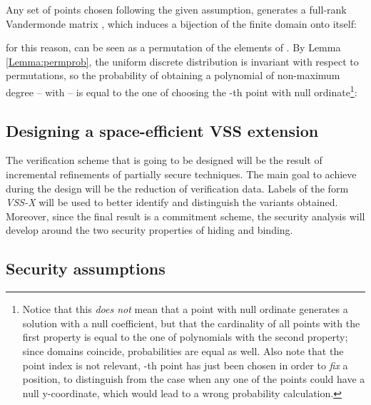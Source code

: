 \documentclass[10pt,journal,cspaper,compsoc]{IEEEtran}
\begin{document}
\begin{IEEEproof}
Any set of points chosen following the given assumption, generates a full-rank Vandermonde matrix , which induces a bijection of the finite domain  onto itself:

for this reason,  can be seen as a permutation of the elements of .
By Lemma \ref{Lemma:permprob}, the uniform discrete distribution is invariant with respect to permutations, so the probability of obtaining a polynomial of non-maximum degree -- with  -- is equal to the one of choosing the -th point with null ordinate\footnote{Notice that this \emph{does not} mean that a point with null ordinate generates a solution  with a null coefficient, but that the cardinality of all points with the first property is equal to the one of polynomials with the second property; since domains coincide, probabilities are equal as well.
Also note that the point index is not relevant, -th point has just been chosen in order to \emph{fix} a position, to distinguish from the case when any one of the points could have a null y-coordinate, which would lead to a wrong probability calculation.}:

\end{IEEEproof}

\subsection{Designing a space-efficient VSS extension}
The verification scheme that is going to be designed will be the result of incremental refinements of partially secure techniques. The main goal to achieve during the design will be the reduction of verification data. Labels of the form \emph{VSS-X} will be used to better identify and distinguish the variants obtained.
Moreover, since the final result is a commitment scheme, the security analysis will develop around the two security properties of hiding and binding.

\subsection{Security assumptions}
\end{document}
